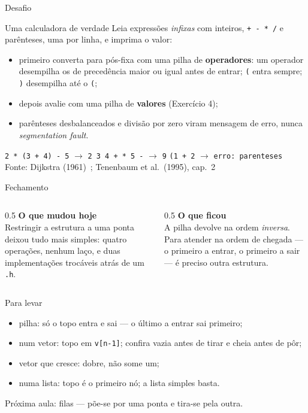 \documentclass[aspectratio=169]{beamer}
\newcommand{\fonte}[1]{\vfill\hfill{\scriptsize\textcolor{UFSGray}{Fonte: #1}}}
\begin{document}
\begin{frame}{Desafio}
  \begin{block}{Uma calculadora de verdade}
    \small Leia expressões \emph{infixas} com inteiros, \texttt{+ - * /} e
    parênteses, uma por linha, e imprima o valor:
    \vspace{-0.3em}
    \begin{itemize}
      \item primeiro converta para pós-fixa com uma pilha de
        \textbf{operadores}: um operador desempilha os de precedência maior
        ou igual antes de entrar; \texttt{(} entra sempre; \texttt{)}
        desempilha até o \texttt{(};
      \item depois avalie com uma pilha de \textbf{valores} (Exercício 4);
      \item parênteses desbalanceados e divisão por zero viram mensagem de
        erro, nunca \emph{segmentation fault}.
    \end{itemize}
  \end{block}
  \vspace{-0.3em}
  \centering\scriptsize
  \texttt{2 * (3 + 4) - 5} $\to$ \texttt{2 3 4 + * 5 -} $\to$ \texttt{9}
  \quad \texttt{(1 + 2} $\to$ \texttt{erro: parenteses}
  \fonte{Dijkstra (1961)~\cite{dijkstra1961algol};
    Tenenbaum et al.\ (1995), cap.~2~\cite{tenenbaum1995estruturas}}
\end{frame}

\begin{frame}{Fechamento}
  \begin{columns}[T]
    \begin{column}{0.5\textwidth}
      \textbf{O que mudou hoje}\\[0.3em]
      \small Restringir a estrutura a uma ponta deixou tudo mais simples:
      quatro operações, nenhum laço, e duas implementações trocáveis atrás
      de um \texttt{.h}.
    \end{column}
    \begin{column}{0.5\textwidth}
      \textbf{O que ficou}\\[0.3em]
      \small A pilha devolve na ordem \emph{inversa}. Para atender na ordem
      de chegada --- o primeiro a entrar, o primeiro a sair --- é preciso
      outra estrutura.
    \end{column}
  \end{columns}
  \begin{block}{Para levar}
    \begin{itemize}
      \small
      \item pilha: só o topo entra e sai --- o último a entrar sai primeiro;
      \item num vetor: topo em \texttt{v[n-1]}; confira vazia antes de
        tirar e cheia antes de pôr;
      \item vetor que cresce: dobre, não some um;
      \item numa lista: topo é o primeiro nó; a lista simples basta.
    \end{itemize}
  \end{block}
  \small\textcolor{UFSGray}{Próxima aula: filas --- põe-se por uma ponta e
  tira-se pela outra.}
\end{frame}
\end{document}
